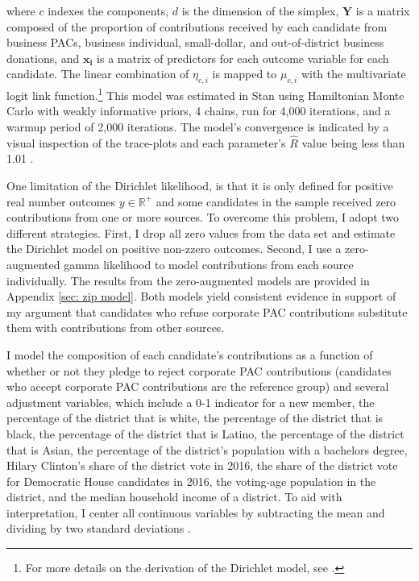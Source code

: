 \documentclass[12pt]{article}
\begin{document}
\noindent where $c$ indexes the components, $d$ is the dimension of the simplex, $\bm{Y}$ is a matrix composed of the proportion of contributions received by each candidate from business PACs, business individual, small-dollar, and out-of-district business donations, and $\bm{x_i}$ is a matrix of predictors for each outcome variable for each candidate. The linear combination of $\eta_{c,i}$ is mapped to $\mu_{c,i}$ with the multivariate logit link function.\footnote{For more details on the derivation of the Dirichlet model, see \citet{hijazi2009}.} This model was estimated in Stan using Hamiltonian Monte Carlo with weakly informative priors, 4 chains, run for 4,000 iterations, and a warmup period of 2,000 iterations. The model's convergence is indicated by a visual inspection of the trace-plots and each parameter's $\hat{R}$ value being less than 1.01 \citep{standevelopmentteam2021, burkner2017a}. 

One limitation of the Dirichlet likelihood, is that it is only defined for positive real number outcomes $y \in  \mathbb{R}^+$ and some candidates in the sample received zero contributions from one or more sources. To overcome this problem, I adopt two different strategies. First, I drop all zero values from the data set and estimate the Dirichlet model on positive non-zzero outcomes. Second, I use a zero-augmented gamma likelihood to model contributions from each source individually. The results from the zero-augmented models are provided in Appendix \ref{sec: zip model}. Both models yield consistent evidence in support of my argument that candidates who refuse corporate PAC contributions substitute them with contributions from other sources. 

I model the composition of each candidate's contributions as a function of whether or not they pledge to reject corporate PAC contributions (candidates who accept corporate PAC contributions are the reference group) and several adjustment variables, which include a 0-1 indicator for a new member, the percentage of the district that is white, the percentage of the district that is black, the percentage of the district that is Latino, the percentage of the district that is Asian, the percentage of the district's population with a bachelors degree, Hilary Clinton's share of the district vote in 2016, the share of the district vote for Democratic House candidates in 2016, the voting-age population in the district, and the median household income of a district. To aid with interpretation, I center all continuous variables by subtracting the mean and dividing by two standard deviations \citep{gelman2020}.
\end{document}
